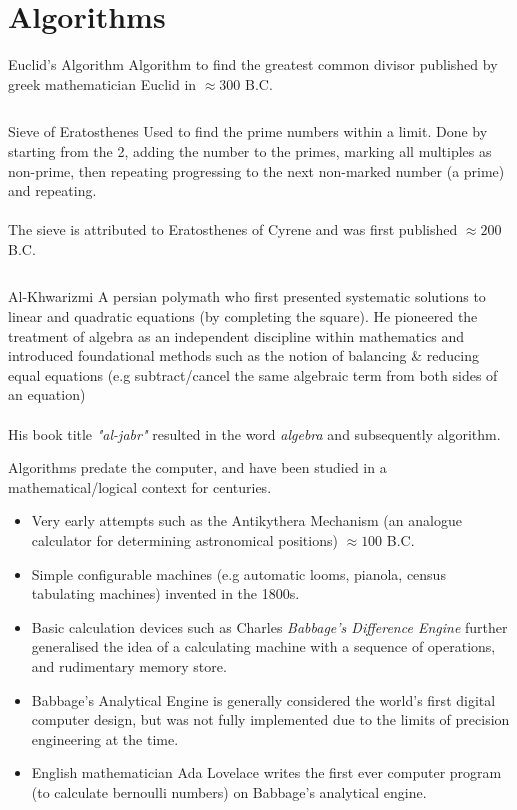 \section{Algorithms}
\begin{sidenotebox}{Euclid's Algorithm}
    Algorithm to find the greatest common divisor published by greek mathematician Euclid in $\approx 300$ B.C.
    \inputminted{haskell}{introduction/code/euclid.hs} 
\end{sidenotebox}
\begin{sidenotebox}{Sieve of Eratosthenes}
    Used to find the prime numbers within a limit. Done by starting from the 2, adding the number to the primes, marking all multiples as non-prime, then repeating progressing to the next non-marked number (a prime) and repeating. 
    \\
    \\ The sieve is attributed to Eratosthenes of Cyrene and was first published $\approx 200$ B.C.
    \inputminted{haskell}{introduction/code/eratosthenes.hs}
\end{sidenotebox}
\begin{sidenotebox}{Al-Khwarizmi}
    A persian polymath who first presented  systematic solutions to linear and quadratic equations (by completing the square). 
    He pioneered the treatment of algebra as an independent discipline within mathematics and introduced foundational methods such as the notion of balancing \& reducing equal equations (e.g subtract/cancel the same algebraic term from both sides of an equation)
    \\
    \\ His book title  \textit{"al-jabr"}  resulted in the word \textit{algebra} and subsequently algorithm.   
\end{sidenotebox}

Algorithms predate the computer, and have been studied in a mathematical/logical context for centuries.
\begin{itemize}
    \item Very early attempts such as the Antikythera Mechanism (an analogue calculator for determining astronomical positions) $\approx 100$ B.C.
    \item Simple configurable machines (e.g automatic looms, pianola, census tabulating machines) invented in the 1800s.
    \item Basic calculation devices such as Charles \textit{Babbage's Difference Engine} further generalised the idea of a calculating machine with a sequence of operations, and rudimentary memory store.
    \item Babbage's Analytical Engine is generally considered the world's first digital computer design, but was not fully implemented due to the limits of precision engineering at the time.
    \item English mathematician Ada Lovelace writes the first ever computer program  (to calculate bernoulli numbers) on Babbage's analytical engine.
\end{itemize}

